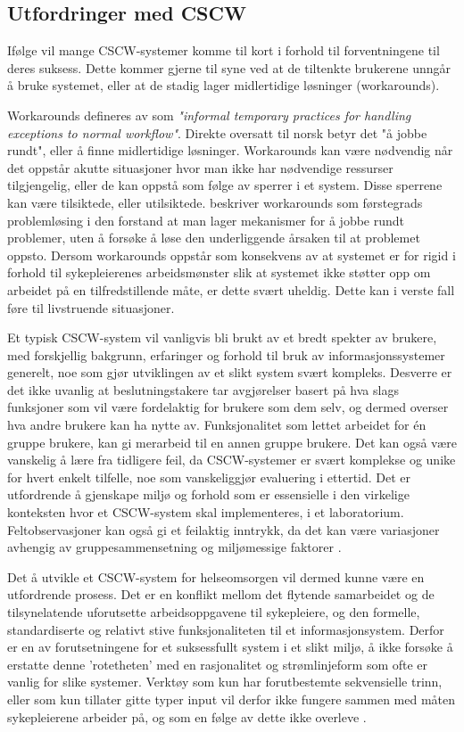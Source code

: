 \subsection{Utfordringer med CSCW}
\label{chp:utfordringerMedCSCW}

\noindent
Ifølge \citet{Berg99} vil mange CSCW-systemer komme til kort i forhold til forventningene til deres suksess. Dette kommer gjerne til syne ved at de tiltenkte brukerene unngår å bruke systemet, eller at de stadig lager midlertidige løsninger (workarounds).

\noindent
Workarounds defineres av \citet{Kobayashi05} som \emph{"informal temporary practices for handling exceptions to normal workflow"}. Direkte oversatt til norsk betyr det "å jobbe rundt", eller å finne midlertidige løsninger.
Workarounds kan være nødvendig når det oppstår akutte situasjoner hvor man ikke har nødvendige ressurser tilgjengelig, eller de kan oppstå som følge av sperrer i et system. Disse sperrene kan være tilsiktede, eller utilsiktede. \citet{Vogelsmeier08} beskriver workarounds som førstegrads problemløsing i den forstand at man lager mekanismer for å jobbe rundt problemer, uten å forsøke å løse den underliggende årsaken til at problemet oppsto. Dersom workarounds oppstår som konsekvens av at systemet er for rigid i forhold til sykepleierenes arbeidsmønster slik at systemet ikke støtter opp om arbeidet på en tilfredstillende måte, er dette svært uheldig. Dette kan i verste fall føre til livstruende situasjoner.


\noindent
Et typisk CSCW-system vil vanligvis bli brukt av et bredt spekter av brukere, med forskjellig bakgrunn, erfaringer og forhold til bruk av informasjonssystemer generelt, noe som gjør utviklingen av et slikt system svært kompleks. Desverre er det ikke uvanlig at beslutningstakere tar avgjørelser basert på hva slags funksjoner som vil være fordelaktig for brukere som dem selv, og dermed overser hva andre brukere kan ha nytte av. Funksjonalitet som lettet arbeidet for én gruppe brukere, kan gi merarbeid til en annen gruppe brukere. Det kan også være vanskelig å lære fra tidligere feil, da CSCW-systemer er svært komplekse og unike for hvert enkelt tilfelle, noe som vanskeliggjør evaluering i ettertid. Det er utfordrende å gjenskape miljø og forhold som er essensielle i den virkelige konteksten hvor et CSCW-system skal implementeres, i et laboratorium. Feltobservasjoner kan også gi et feilaktig inntrykk, da det kan være variasjoner avhengig av gruppesammensetning og miljømessige faktorer \citep{Berg99}.

\noindent
Det å utvikle et CSCW-system for helseomsorgen vil dermed kunne være en utfordrende prosess. Det er en konflikt mellom det flytende samarbeidet og de tilsynelatende uforutsette arbeidsoppgavene til sykepleiere, og den formelle, standardiserte og relativt stive funksjonaliteten til et informasjonsystem. Derfor er en av forutsetningene for et suksessfullt system i et slikt miljø, å ikke forsøke å erstatte denne 'rotetheten' med en rasjonalitet og strømlinjeform som ofte er vanlig for slike systemer. Verktøy som kun har forutbestemte sekvensielle trinn, eller som kun tillater gitte typer input vil derfor ikke fungere sammen med måten sykepleierene arbeider på, og som en følge av dette ikke overleve \citep{Berg99}.